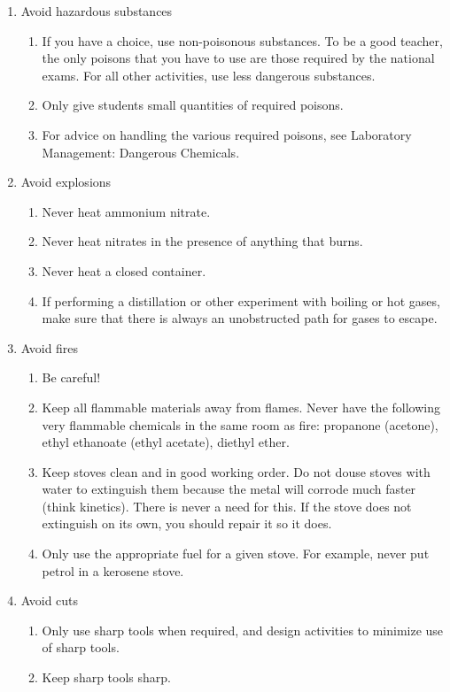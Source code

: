\begin{enumerate}
\begin{enumerate}
\end{enumerate}
\item{Avoid hazardous substances}
\begin{enumerate}
\item{If you have a choice, use non-poisonous substances. 
To be a good teacher, the only poisons that you have to use 
are those required by the national exams. 
For all other activities, use less dangerous substances.}
\item{Only give students small quantities of required poisons.}
\item{For advice on handling the various required poisons, 
see Laboratory Management: Dangerous Chemicals.}
\end{enumerate}
\item{Avoid explosions}
\begin{enumerate}
\item{Never heat ammonium nitrate.}
\item{Never heat nitrates in the presence of anything that burns.}
\item{Never heat a closed container.}
\item{If performing a distillation 
or other experiment with boiling or hot gases, 
make sure that there is always an unobstructed path for gases to escape.}
\end{enumerate}
\item{Avoid fires}
\begin{enumerate}
\item{Be careful!}
\item{Keep all flammable materials away from flames. 
Never have the following very flammable chemicals in the same room as fire: 
propanone (acetone), ethyl ethanoate (ethyl acetate), diethyl ether.}
\item{Keep stoves clean and in good working order. 
Do not douse stoves with water to extinguish them 
because the metal will corrode much faster (think kinetics). 
There is never a need for this. 
If the stove does not extinguish on its own, you should repair it so it does.}
\item{Only use the appropriate fuel for a given stove. 
For example, never put petrol in a kerosene stove.}
\end{enumerate}
\item{Avoid cuts}
\begin{enumerate}
\item{Only use sharp tools when required, 
and design activities to minimize use of sharp tools.}
\item{Keep sharp tools sharp. 
}
\end{enumerate}
\end{enumerate}

